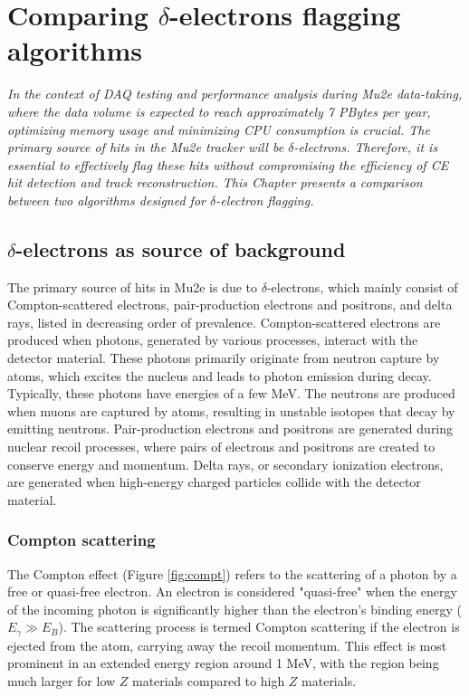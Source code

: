 \chapter{Comparing $\delta$-electrons flagging algorithms}\label{delta}
\textit{In the context of DAQ testing and performance analysis during Mu2e data-taking, 
where the data volume is expected to reach approximately 7 PBytes per year, optimizing 
memory usage and minimizing CPU consumption is crucial. The primary source of hits in the 
Mu2e tracker will be $\delta$-electrons. Therefore, it is essential to effectively flag these 
hits without compromising the efficiency of CE hit detection and track reconstruction. This 
Chapter presents a comparison between two algorithms designed for $\delta$-electron flagging.}

\section{$\delta$-electrons as source of background}

The primary source of hits in Mu2e is due to $\delta$-electrons, 
which mainly consist of Compton-scattered electrons, pair-production 
electrons and positrons, and delta rays, listed in decreasing 
order of prevalence. Compton-scattered electrons are produced 
when photons, generated by various processes, interact with the 
detector material. These photons primarily originate from 
neutron capture by atoms, which excites the nucleus and leads 
to photon emission during decay. Typically, these photons have 
energies of a few MeV. The neutrons are produced when muons are 
captured by atoms, resulting in unstable isotopes that decay by 
emitting neutrons. Pair-production electrons and positrons are 
generated during nuclear recoil processes, where pairs of electrons 
and positrons are created to conserve energy and momentum. Delta rays, 
or secondary ionization electrons, are generated when high-energy 
charged particles collide with the detector material.


\subsection{Compton scattering}
The Compton effect (Figure \ref{fig:compt}) refers to the 
scattering of a photon by a free or quasi-free electron. 
An electron is considered "quasi-free" when the energy of 
the incoming photon is significantly higher than the 
electron's binding energy ($E_\gamma \gg E_B$). The 
scattering process is termed Compton scattering if the 
electron is ejected from the atom, carrying away the 
recoil momentum. This effect is most prominent in an 
extended energy region around 1 MeV, with the region 
being much larger for low $Z$ materials compared to high $Z$ materials.

